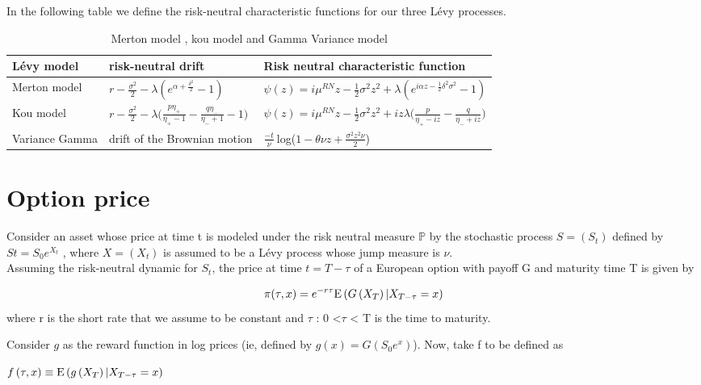 \documentclass[12pt]{report}
\begin{document}
In the following table we define the risk-neutral characteristic functions for our three Lévy processes.
\begin {table}[h!]
\begin{center}
\renewcommand{\arraystretch}{2}
\begin{tabular}{|l|l|l|}
 \hline
   Lévy model  & risk-neutral drift & Risk neutral characteristic function   \\
 \hline
Merton model  & $r-\frac{\sigma^2}{2}-\lambda (e^{\alpha+\frac{\delta^2}{2}}-1)$ & $\psi (z)= i\mu^{RN}z - \frac{1}{2}\sigma^2  z^2 + \lambda (e^{i \alpha z - \frac{1}{2} \delta ^2 \sigma^2}-1)$  \\
 \hline
 Kou model  & $r-\frac{\sigma^2}{2}-\lambda \big(\frac{p \eta_+}{\eta_+ -1}-\frac{q \eta_-}{\eta_- + 1}-1\big)$ & $\psi (z)= i\mu^{RN}z - \frac{1}{2}\sigma^2  z^2 + i z \lambda \big(\frac{p}{\eta_+- i z}- \frac{q}{\eta_- + i z}\big) $   \\
\hline
Variance Gamma & drift of the Brownian motion & $\frac{-t}{\nu}~$log($1-\theta \nu z +\frac{\sigma^2 z^2 \nu}{2}$)  \\
\hline
\end{tabular}
\end{center}
\caption{Merton model , kou model and Gamma Variance model} 
\end{table}
\section{Option price}
Consider an asset whose price at time t is modeled under the risk neutral measure $\mathbb{P}$ by the stochastic process $S = (S_t)$
defined by $St = S_0 e^{X_t}$ , where $X = (X_t)$  is assumed to be a Lévy process whose
jump measure is $\nu$.\\

Assuming the risk-neutral dynamic for $S_t$, the price at time $t = T-\tau$  of a European option with payoff G and maturity time T is given by

\begin{gather}
\pi(\tau,x)= e^{-r\tau} \mathrm{E} \left( {{G \left( {X_T} \right)|X_{T-\tau} = x}} \right)
\label{price}
\end{gather}
where r is the short rate that we assume to be constant and $\tau$ : 0 <$\tau$ < T is the time to
maturity.

Consider $g$ as the reward function in log prices (ie, defined by $g(x) = G(S_0e^x)$). Now, take f to be defined as
\begin{center}
$f \left( {\tau,x} \right) \equiv \mathrm{E} \left( {{g \left( {X_T} \right)|X_{T-\tau} = x}} \right)$
\end{center}
\end{document}
